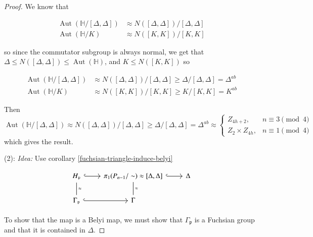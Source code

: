 \documentclass[reqno]{amsart}
\theoremstyle{definition}
\theoremstyle{remark}
\DeclareMathOperator{\Aut}{Aut}
\begin{document}
\begin{proof}
We know \cite[Prop. 2.35]{Girondo-Gonzalez-Diez} that 

\begin{align*}
    \Aut (\mathbb{H}/ \left[\Delta, \Delta \right])
&\approx N (\left[\Delta, \Delta \right])
/ \left[\Delta, \Delta \right]\\
\Aut( \mathbb{H} / K) 
&\approx
N(\left[K,K \right])/ \left[K,K \right]
\end{align*}

so since the commutator subgroup is always normal,
we get that $\Delta \leq N(\left[\Delta, \Delta \right]) \leq \Aut(\mathbb{H})$, and
$K \leq N(\left[K,K \right])$
so

\begin{align*}
    \Aut (\mathbb{H}/ \left[\Delta, \Delta \right])
&\approx N (\left[\Delta, \Delta \right])
/ \left[\Delta, \Delta \right] 
\geq \Delta / \left[\Delta, \Delta \right] = \Delta^{ab}\\
\Aut (\mathbb{H}/ K)
&\approx N (\left[K,K \right])/ \left[K,K \right]
\geq K / \left[K,K \right] = K^{ab}
\end{align*}

Then
\[\Aut (\mathbb{H}/ \left[\Delta, \Delta \right])
\approx N (\left[\Delta, \Delta \right])
/ \left[\Delta, \Delta \right] 
\geq \Delta/ \left[\Delta, \Delta \right]
= \Delta^{ab} \approx
\begin{cases}
    Z_{4h+2},& n \equiv 3 \pmod{4}\\
    Z_2 \times Z_{4h},& n \equiv 1 \pmod{4}
\end{cases}\]
which gives the result.\\
\linebreak

(2): 
\textit{Idea:} Use corollary \ref{fuchsian-triangle-induce-belyi}

\begin{equation*}
            \begin{tikzcd}
                H_{\mathfrak{p}} 
                \ar[d, dash, "\approx"]\ar[r,
                hookrightarrow] & \pi_1 (P_{n-1}/\sim) \approx
                \left[\Delta, \Delta \right]\ar[d, dash, "\approx"]
                \ar[r,hookrightarrow]&
                \Delta
                \\
                \Gamma_{\mathfrak{p}} 
                \ar[r, hookrightarrow]&
                \Gamma
            \end{tikzcd}
        \end{equation*}

        To show that the map is
        a Belyi map, we must show that $\Gamma_{\mathfrak{p}}$ is a Fuchsian group and that it is
        contained in $\Delta$.


\end{proof}
\end{document}
